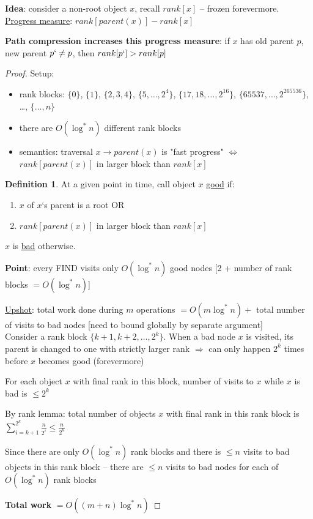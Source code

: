 \documentclass[a4paper,12pt]{article}
\theoremstyle{plain}
\theoremstyle{definition}
\newtheorem*{definition}{Definition}
\theoremstyle{remark}
\begin{document}
\textbf{Idea}: consider a non-root object $x$, recall $rank[x]$ -- frozen forevermore. \underline{Progress measure}: $rank[parent(x)] - rank[x]$

\textbf{Path compression increases this progress measure}: if $x$ has old parent $p$, new parent $p` \neq p$, then $rank[p`] > rank[p]$

\begin{proof}
Setup:
\begin{itemize}
	\item rank blocks: $\{0\}$, $\{1\}$, $\{2, 3, 4\}$, $\{5, \dots, 2^4\}$, $\{17, 18, \dots, 2^{16}\}$, $\{65537, \dots, 2^{265536}\}$, \dots, $\{\dots, n\}$
	\item there are $O(\log^* n)$ different rank blocks
	\item semantics: traversal $x \rightarrow parent(x)$ is "fast progress" $\iff$ $rank[parent(x)]$ in larger block than $rank[x]$
\end{itemize}

\begin{definition}
At a given point in time, call object $x$ \underline{good} if:
\begin{enumerate}
	\item $x$ of $x$`s parent is a root OR
	\item $rank[parent(x)]$ in larger block than $rank[x]$
\end{enumerate}
$x$ is \underline{bad} otherwise.
\end{definition}

\textbf{Point}: every FIND visits only $O(\log^* n)$ good nodes [2 + number of rank blocks $= O(\log^* n)$]

\underline{Upshot}: total work done during $m$ operations $= O(m \log^* n) +$ total number of visits to bad nodes [need to bound globally by separate argument]
\\

Consider a rank block $\{k+1, k+2, \dots, 2^k\}$. When a bad node $x$ is visited, its parent is changed to one with strictly larger rank $\Rightarrow$ can only happen $2^k$ times before $x$ becomes good (forevermore)

For each object $x$ with final rank in this block, number of visits to $x$ while $x$ is bad is $\leq 2^k$

By rank lemma: total number of objects $x$ with final rank in this rank block is $\sum\limits_{i = k+1}^{2^k} \frac{n}{2^i} \leq \frac{n}{2^k}$

Since there are only $O(\log^* n)$ rank blocks and there is $\leq n$ visits to bad objects in this rank block -- there are $\leq n$ visits to bad nodes for each of $O(\log^* n)$ rank blocks

\textbf{Total work} $= O((m+n) \log^* n)$
\end{proof}
\end{document}
